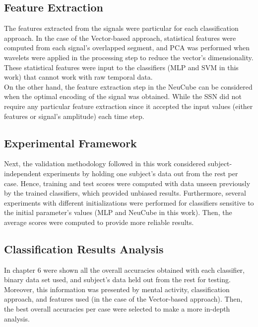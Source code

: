 \subsection{Feature Extraction}

The features extracted from the signals were particular for each classification approach. In the case of the Vector-based approach, statistical features were computed from each signal's overlapped segment, and PCA was performed when wavelets were applied in the processing step to reduce the vector's dimensionality. These statistical features were input to the classifiers (MLP and SVM in this work) that cannot work with raw temporal data.\\

On the other hand, the feature extraction step in the NeuCube can be considered when the optimal encoding of the signal was obtained. While the SSN did not require any particular feature extraction since it accepted the input values (either features or signal's amplitude) each time step.\\


\subsection{Experimental Framework}
Next, the validation methodology followed in this work considered subject-independent experiments by holding one subject's data out from the rest per case. Hence, training and test scores were computed with data unseen previously by the trained classifiers, which provided unbiased results. Furthermore, several experiments with different initializations were performed for classifiers sensitive to the initial parameter's values (MLP and NeuCube in this work). Then, the average scores were computed to provide more reliable results.\\

\subsection{Classification Results Analysis}

In chapter 6 were shown all the overall accuracies obtained with each classifier, binary data set used, and subject's data held out from the rest for testing. Moreover, this information was presented by mental activity, classification approach, and features used (in the case of the Vector-based approach). Then, the best overall accuracies per case were selected to make a more in-depth analysis.\\

